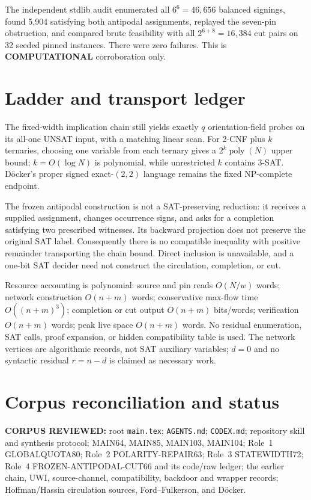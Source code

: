 \documentclass[11pt]{article}
\begin{document}
The independent stdlib audit enumerated all $6^6=46{,}656$ balanced signings, found 5,904 satisfying both antipodal assignments, replayed the seven-pin obstruction, and compared brute feasibility with all $2^{6+8}=16{,}384$ cut pairs on 32 seeded pinned instances.  There were zero failures.  This is \textbf{COMPUTATIONAL} corroboration only.

\section{Ladder and transport ledger}
The fixed-width implication chain still yields exactly $q$ orientation-field probes on its all-one UNSAT input, with a matching linear scan.  For 2-CNF plus $k$ ternaries, choosing one variable from each ternary gives a $2^k\operatorname{poly}(N)$ upper bound; $k=O(\log N)$ is polynomial, while unrestricted $k$ contains 3-SAT.  D\"ocker's proper signed exact-$(2,2)$ language remains the fixed NP-complete endpoint.

The frozen antipodal construction is not a SAT-preserving reduction: it receives a supplied assignment, changes occurrence signs, and asks for a completion satisfying two prescribed witnesses.  Its backward projection does not preserve the original SAT label.  Consequently there is no compatible inequality with positive remainder transporting the chain bound.  Direct inclusion is unavailable, and a one-bit SAT decider need not construct the circulation, completion, or cut.

Resource accounting is polynomial: source and pin reads $O(N/w)$ words; network construction $O(n+m)$ words; conservative max-flow time $O((n+m)^3)$; completion or cut output $O(n+m)$ bits/words; verification $O(n+m)$ words; peak live space $O(n+m)$ words.  No residual enumeration, SAT calls, proof expansion, or hidden compatibility table is used.  The network vertices are algorithmic records, not SAT auxiliary variables; $d=0$ and no syntactic residual $r=n-d$ is claimed as necessary work.

\section{Corpus reconciliation and status}
\textbf{CORPUS REVIEWED:} root \texttt{main.tex}; \texttt{AGENTS.md}; \texttt{CODEX.md}; repository skill and synthesis protocol; MAIN64, MAIN85, MAIN103, MAIN104; Role~1 GLOBALQUOTA80; Role~2 POLARITY-REPAIR63; Role~3 STATEWIDTH72; Role~4 FROZEN-ANTIPODAL-CUT66 and its code/raw ledger; the earlier chain, UWI, source-channel, compatibility, backdoor and wrapper records; Hoffman/Hassin circulation sources, Ford--Fulkerson, and D\"ocker.
\end{document}
